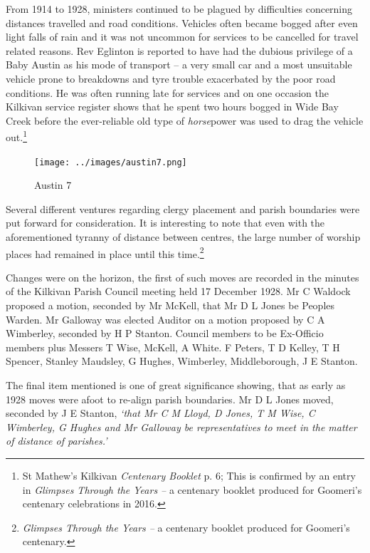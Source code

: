 From 1914 to 1928, ministers continued to be plagued by difficulties concerning distances travelled and road conditions. Vehicles often became bogged after even light falls of rain and it was not uncommon for services to be cancelled for travel related reasons. Rev Eglinton is reported to have had the dubious privilege of a Baby Austin as his mode of transport -- a very small car and a most unsuitable vehicle prone to breakdowns and tyre trouble exacerbated by the poor road conditions. He was often running late for services and on one occasion the Kilkivan service register shows that he spent two hours bogged in Wide Bay Creek before the ever-reliable old type of \emph{horse}power was used to drag the vehicle out.\footnote{St Mathew's Kilkivan \emph{Centenary Booklet} p. 6; This is confirmed by an entry in \emph{Glimpses Through the Years --} a centenary booklet produced for Goomeri's centenary celebrations in 2016.}








\begin{figure}[!htb]
\begin{center}
\texttt{[image: ../images/austin7.png]}
\caption{Austin 7}
\end{center}
\end{figure}




Several different ventures regarding clergy placement and parish boundaries were put forward for consideration. It is interesting to note that even with the aforementioned tyranny of distance between centres, the large number of worship places had remained in place until this time.\footnote{\emph{Glimpses Through the Years --} a centenary booklet produced for Goomeri's centenary.}


Changes were on the horizon, the first of such moves are recorded in the minutes of the Kilkivan Parish Council meeting held 17 December 1928. Mr C Waldock proposed a motion, seconded by Mr McKell, that Mr D L Jones be Peoples Warden. Mr Galloway was elected Auditor on a motion proposed by C A Wimberley, seconded by H P Stanton. Council members to be Ex-Officio members plus Messers T Wise, McKell, A White. F Peters, T D Kelley, T H Spencer, Stanley Maudsley, G Hughes, Wimberley, Middleborough, J E Stanton.



The final item mentioned is one of great significance showing, that as early as 1928 moves were afoot to re-align parish boundaries. Mr D L Jones moved, seconded by J E Stanton, \emph{`that Mr C M Lloyd, D Jones, T M Wise, C Wimberley, G Hughes and Mr Galloway be representatives to meet in the matter of distance of parishes.'}



